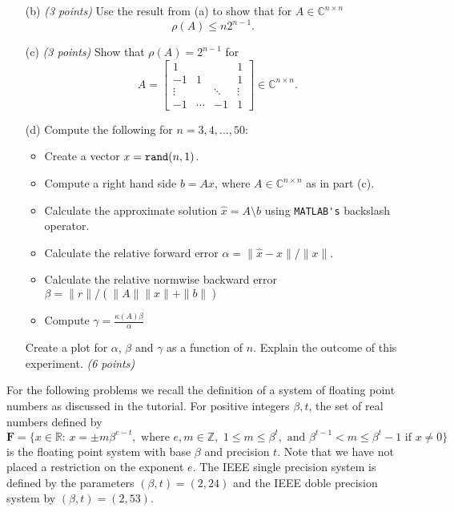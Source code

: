 \documentclass[10pt]{report}
\begin{document}
\begin{enumerate}
\begin{enumerate}
\item[(b)] \textit{(3 points)} Use the result from (a) to show that for $A \in \mathbb{C}^{n \times n}$
\[ \rho(A) \leq n2^{n-1}. \,\,\,\,\, \]







    \item[(c)] \textit{(3 points)}  Show that $\rho(A)=2^{n-1}$ for
    \[A=\left[\begin{array}{rccc}1&&&1\\-1&1&&1\\\vdots&&\ddots&\vdots\\-1&\cdots&-1&1\end{array}\right]\in\mathbb{C}^{n\times n}.\]
    \item[(d)]Compute the following for $n=3,4,...,50$:
      \begin{itemize}
        \item Create a vector $x=\verb+rand+(n,1)$.
        \item Compute a right hand side $b=Ax$, where $A \in \mathbb{C}^{n \times n}$ as in part (c).
        \item Calculate the approximate solution $\hat{x}=A\setminus b$ using \verb+MATLAB's+ backslash operator.
        \item Calculate the relative forward error $\alpha=\|\hat{x}-x\|/\|x\|$.
        \item Calculate the relative normwise backward error $\beta=\|r\|/(\|A\|\|\hat{x}\|+\|b\|)$
        \item Compute $\gamma=\frac{\kappa(A)\beta}{\alpha}$
        \end{itemize}
        Create a plot for $\alpha$, $\beta$ and $\gamma$ as a function of $n$. Explain the outcome of this experiment.  \textit{(6 points)} 
    \end{enumerate}

\vspace{0.1cm} 


For the following problems we recall the definition of a system of floating point numbers as discussed in the tutorial. For positive integers $\beta, t$, the set of real numbers defined by
\[\mathbf{F}= \{ x \in \mathbb{R}:\,  x = \pm m \beta^{e-t}, \text{ where } e, m \in \mathbb{Z}, \,\,  1 \leq m \leq \beta^t, \text{ and } \beta^{t-1}< m \leq \beta^t -1 \text{ if } x \neq 0\}\]
is the floating point system with base $\beta$ and precision $t$. Note that we have not placed a restriction on the exponent $e$. The IEEE single precision system is defined by the parameters $(\beta, t)=(2,24)$ and the IEEE doble precision system by $(\beta, t)=(2,53)$.


\end{enumerate}
\end{document}
